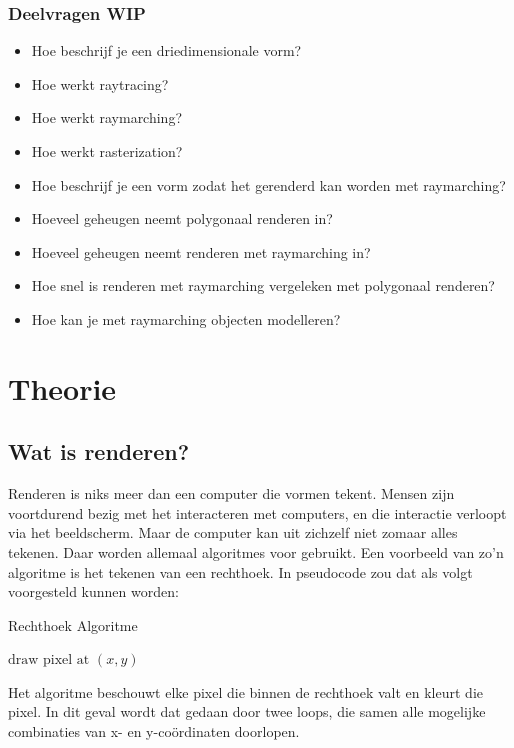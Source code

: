 \documentclass[12pt, a4paper]{article}
\begin{document}
\subsubsection{Deelvragen WIP}
\begin{itemize}
\item{Hoe beschrijf je een driedimensionale vorm?}
\item{Hoe werkt raytracing?}
\item{Hoe werkt raymarching?}
\item{Hoe werkt rasterization?}
\item{Hoe beschrijf je een vorm zodat het gerenderd kan worden met raymarching?}
\item{Hoeveel geheugen neemt polygonaal renderen in?}
\item{Hoeveel geheugen neemt renderen met raymarching in?}
\item{Hoe snel is renderen met raymarching vergeleken met polygonaal renderen?}
\item{Hoe kan je met raymarching objecten modelleren?}
\end{itemize}
\clearpage
\section{Theorie}
\subsection{Wat is renderen?}
Renderen is niks meer dan een computer die vormen tekent. Mensen zijn voortdurend bezig met het interacteren met computers, en die interactie verloopt via het beeldscherm. Maar de computer kan uit zichzelf niet zomaar alles tekenen. Daar worden allemaal algoritmes voor gebruikt. Een voorbeeld van zo'n algoritme is het tekenen van een rechthoek. In pseudocode zou dat als volgt voorgesteld kunnen worden:
\begin{algorithm}
\caption{Rechthoek Algoritme}
\begin{algorithmic}[1]
		\State $\text{draw pixel at }(x, y)$
	    \EndFor
    \EndFor
\EndProcedure
\end{algorithmic}
\end{algorithm}

Het algoritme beschouwt elke pixel die binnen de rechthoek valt en kleurt die pixel. In dit geval wordt dat gedaan door twee loops, die samen alle mogelijke combinaties van x- en y-coördinaten doorlopen. 
\end{document}
